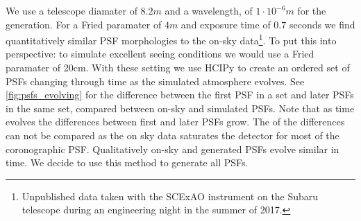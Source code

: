 We use a telescope diamater of $8.2m$ and a wavelength, of $1\cdot 10^{-6}m$ for the generation. For a Fried paramater of $4m$ and exposure time of $0.7$ seconds we find quantitatively similar \ac{PSF} morphologies to the on-sky data\footnote{Unpublished data taken with the SCExAO instrument on the Subaru telescope during an engineering night in the summer of 2017.}. To put this into perspective: to simulate excellent seeing conditions we would use a Fried paramater of 20cm. With these setting we use \ac{HCIPy} to create an ordered set of \acp{PSF} changing through time as the simulated atmosphere evolves. See \autoref{fig:psfs_evolving} for the difference between the first \ac{PSF} in a set and later \acp{PSF} in the same set, compared between on-sky and simulated \acp{PSF}. Note that as time evolves the differences between first and later \acp{PSF} grow. The  of the differences can not be compared as the on sky data saturates the detector for most of the coronographic \ac{PSF}. Qualitatively on-sky and generated \acp{PSF} evolve similar in time. We decide to use this method to generate all \acp{PSF}.



